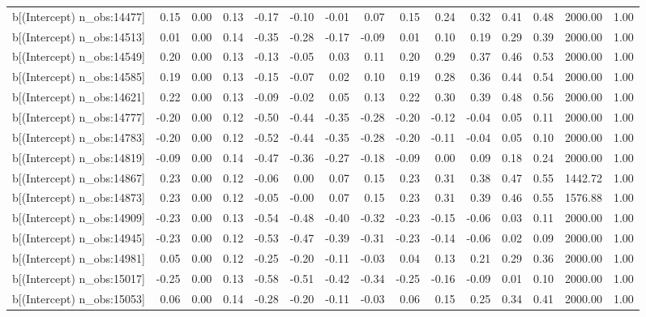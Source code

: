 \begin{table}[ht]
\begin{tabular}{rrrrrrrrrrrrrrr}
  b[(Intercept) n\_obs:14477] & 0.15 & 0.00 & 0.13 & -0.17 & -0.10 & -0.01 & 0.07 & 0.15 & 0.24 & 0.32 & 0.41 & 0.48 & 2000.00 & 1.00 \\ 
  b[(Intercept) n\_obs:14513] & 0.01 & 0.00 & 0.14 & -0.35 & -0.28 & -0.17 & -0.09 & 0.01 & 0.10 & 0.19 & 0.29 & 0.39 & 2000.00 & 1.00 \\ 
  b[(Intercept) n\_obs:14549] & 0.20 & 0.00 & 0.13 & -0.13 & -0.05 & 0.03 & 0.11 & 0.20 & 0.29 & 0.37 & 0.46 & 0.53 & 2000.00 & 1.00 \\ 
  b[(Intercept) n\_obs:14585] & 0.19 & 0.00 & 0.13 & -0.15 & -0.07 & 0.02 & 0.10 & 0.19 & 0.28 & 0.36 & 0.44 & 0.54 & 2000.00 & 1.00 \\ 
  b[(Intercept) n\_obs:14621] & 0.22 & 0.00 & 0.13 & -0.09 & -0.02 & 0.05 & 0.13 & 0.22 & 0.30 & 0.39 & 0.48 & 0.56 & 2000.00 & 1.00 \\ 
  b[(Intercept) n\_obs:14777] & -0.20 & 0.00 & 0.12 & -0.50 & -0.44 & -0.35 & -0.28 & -0.20 & -0.12 & -0.04 & 0.05 & 0.11 & 2000.00 & 1.00 \\ 
  b[(Intercept) n\_obs:14783] & -0.20 & 0.00 & 0.12 & -0.52 & -0.44 & -0.35 & -0.28 & -0.20 & -0.11 & -0.04 & 0.05 & 0.10 & 2000.00 & 1.00 \\ 
  b[(Intercept) n\_obs:14819] & -0.09 & 0.00 & 0.14 & -0.47 & -0.36 & -0.27 & -0.18 & -0.09 & 0.00 & 0.09 & 0.18 & 0.24 & 2000.00 & 1.00 \\ 
  b[(Intercept) n\_obs:14867] & 0.23 & 0.00 & 0.12 & -0.06 & 0.00 & 0.07 & 0.15 & 0.23 & 0.31 & 0.38 & 0.47 & 0.55 & 1442.72 & 1.00 \\ 
  b[(Intercept) n\_obs:14873] & 0.23 & 0.00 & 0.12 & -0.05 & -0.00 & 0.07 & 0.15 & 0.23 & 0.31 & 0.39 & 0.46 & 0.55 & 1576.88 & 1.00 \\ 
  b[(Intercept) n\_obs:14909] & -0.23 & 0.00 & 0.13 & -0.54 & -0.48 & -0.40 & -0.32 & -0.23 & -0.15 & -0.06 & 0.03 & 0.11 & 2000.00 & 1.00 \\ 
  b[(Intercept) n\_obs:14945] & -0.23 & 0.00 & 0.12 & -0.53 & -0.47 & -0.39 & -0.31 & -0.23 & -0.14 & -0.06 & 0.02 & 0.09 & 2000.00 & 1.00 \\ 
  b[(Intercept) n\_obs:14981] & 0.05 & 0.00 & 0.12 & -0.25 & -0.20 & -0.11 & -0.03 & 0.04 & 0.13 & 0.21 & 0.29 & 0.36 & 2000.00 & 1.00 \\ 
  b[(Intercept) n\_obs:15017] & -0.25 & 0.00 & 0.13 & -0.58 & -0.51 & -0.42 & -0.34 & -0.25 & -0.16 & -0.09 & 0.01 & 0.10 & 2000.00 & 1.00 \\ 
  b[(Intercept) n\_obs:15053] & 0.06 & 0.00 & 0.14 & -0.28 & -0.20 & -0.11 & -0.03 & 0.06 & 0.15 & 0.25 & 0.34 & 0.41 & 2000.00 & 1.00 \\ 

\end{tabular}
\end{table}
